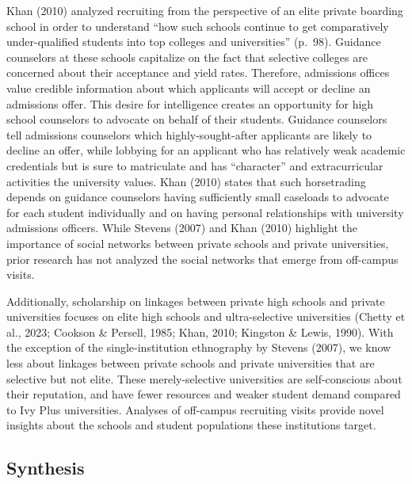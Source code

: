 \documentclass[
  12pt,
]{article}
\begin{document}
Khan (2010) analyzed recruiting from the perspective of an elite private boarding school in order to understand ``how such schools continue to get comparatively under-qualified students into top colleges and universities'' (p.~98). Guidance counselors at these schools capitalize on the fact that selective colleges are concerned about their acceptance and yield rates. Therefore, admissions offices value credible information about which applicants will accept or decline an admissions offer. This desire for intelligence creates an opportunity for high school counselors to advocate on behalf of their students. Guidance counselors tell admissions counselors which highly-sought-after applicants are likely to decline an offer, while lobbying for an applicant who has relatively weak academic credentials but is sure to matriculate and has ``character'' and extracurricular activities the university values. Khan (2010) states that such horsetrading depends on guidance counselors having sufficiently small caseloads to advocate for each student individually and on having personal relationships with university admissions officers. While Stevens (2007) and Khan (2010) highlight the importance of social networks between private schools and private universities, prior research has not analyzed the social networks that emerge from off-campus visits.

Additionally, scholarship on linkages between private high schools and private universities focuses on elite high schools and ultra-selective universities (Chetty et al., 2023; Cookson \& Persell, 1985; Khan, 2010; Kingston \& Lewis, 1990). With the exception of the single-institution ethnography by Stevens (2007), we know less about linkages between private schools and private universities that are selective but not elite. These merely-selective universities are self-conscious about their reputation, and have fewer resources and weaker student demand compared to Ivy Plus universities. Analyses of off-campus recruiting visits provide novel insights about the schools and student populations these institutions target.

\subsection{Synthesis}\label{synthesis}
\end{document}
